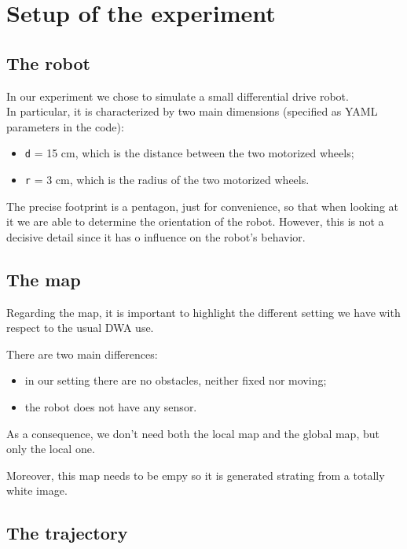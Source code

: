 \documentclass[11pt,a4paper]{article}
\begin{document}
\section{Setup of the experiment}

\subsection{The robot}

In our experiment we chose to simulate a small differential drive robot.\\

In particular, it is characterized by two main dimensions (specified as YAML parameters in the code):
\begin{itemize}
 \item \texttt{d} = 15 cm, which is the distance between the two motorized wheels;
 \item \texttt{r} = 3 cm, which is the radius of the two motorized wheels.\\
\end{itemize}

The precise footprint is a pentagon, just for convenience, so that when looking at it we are able to determine the orientation of the robot.
However, this is not a decisive detail since it has o influence on the robot's behavior.


\subsection{The map}

Regarding the map, it is important to highlight the different setting we have with respect to the usual DWA use.

There are two main differences:
\begin{itemize}
 \item in our setting there are no obstacles, neither fixed nor moving;
 \item the robot does not have any sensor.\\
\end{itemize}

As a consequence, we don't need both the local map and the global map, but only the local one.

Moreover, this map needs to be empy so it is generated strating from a totally white image.


\subsection{The trajectory}
\end{document}
